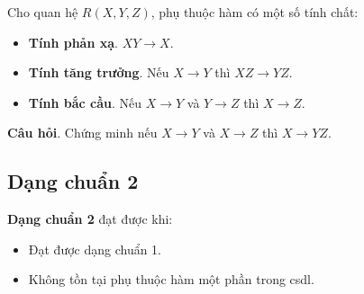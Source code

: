 \documentclass[11pt]{beamer}
\newcommand{\fd}[2]{#1 \rightarrow #2}%
\begin{document}
\begin{frame}
  Cho quan hệ $R(X, Y, Z)$, phụ thuộc hàm có một số tính chất:
  \begin{itemize}
    \item \textbf{Tính phản xạ}. $\fd{XY}{X}$.
    \item \textbf{Tính tăng trưởng}. Nếu $\fd{X}{Y}$ thì $\fd{XZ}{YZ}$.
    \item \textbf{Tính bắc cầu}. Nếu $\fd{X}{Y}$ và $\fd{Y}{Z}$ thì $\fd{X}{Z}$.
  \end{itemize}
  \textbf{Câu hỏi}. Chứng minh nếu $\fd{X}{Y}$ và $\fd{X}{Z}$ thì $\fd{X}{YZ}$.
\end{frame}

\begin{frame}
  
\end{frame}
\subsection{Dạng chuẩn 2}
\begin{frame}
  \textbf{Dạng chuẩn 2} đạt được khi:
  \begin{itemize}
    \item Đạt được dạng chuẩn 1.
    \item Không tồn tại phụ thuộc hàm một phần trong csdl.
  \end{itemize}
\end{frame}
\end{document}
